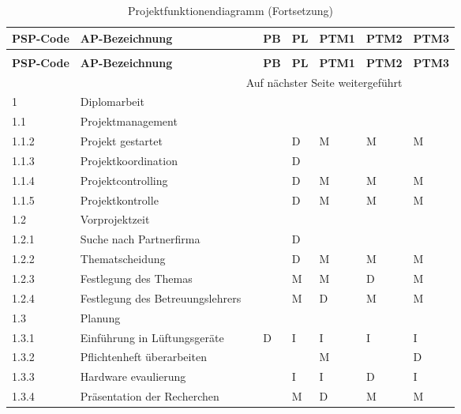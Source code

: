 \newpage
\begin{longtable}{p{} p{} p{} p{}  p{} p{} p{} p{}}
	\caption{Projektfunktionendiagramm}
	\label{tab:funktionendiagramm}
	\\ \toprule
	\textbf{PSP-Code} & \textbf{AP-Bezeichnung} & & \textbf{PB} & \textbf{PL} & \textbf{PTM1} & \textbf{PTM2} & \textbf{PTM3}
	\\ \midrule
	\endfirsthead
	\caption{Projektfunktionendiagramm (Fortsetzung)}
	\\ \toprule
	\textbf{PSP-Code} & \textbf{AP-Bezeichnung} & & \textbf{PB} & \textbf{PL} & \textbf{PTM1} & \textbf{PTM2} & \textbf{PTM3}
	\\ \midrule
	\endhead
	\midrule
	\multicolumn{7}{r}{{Auf nächster Seite weitergeführt}} 
	\\ \bottomrule
	\endfoot
	\bottomrule
	\endlastfoot
	\rowcolor{mygray} 1 & Diplomarbeit & & & & & & \\ \midrule
	\rowcolor{mygray2}1.1 & Projektmanagement & & & & & &\\ \midrule
	1.1.2 & Projekt gestartet & & & D & M & M & M \\ \midrule
	1.1.3 & Projektkoordination & & & D & & & \\ \midrule
	1.1.4 & Projektcontrolling & & & D & M & M & M \\ \midrule
	1.1.5 & Projektkontrolle & & & D & M & M & M \\ \midrule
	\rowcolor{mygray2}1.2 & Vorprojektzeit & & & & & & \\ \midrule
	1.2.1 & Suche nach Partnerfirma & & & D & & & \\ \midrule
	1.2.2 & Thematscheidung & & & D & M & M & M \\ \midrule
	1.2.3 & Festlegung des Themas & & & M & M & D & M \\ \midrule
	1.2.4 & Festlegung des Betreuungslehrers & & & M & D & M & M \\ \midrule
	\rowcolor{mygray2}1.3 & Planung & & & & & & \\ \midrule
	1.3.1 & Einführung in Lüftungsgeräte & & D & I & I & I & I \\ \midrule
	1.3.2 & Pflichtenheft überarbeiten & & & & M & & D \\ \midrule
	1.3.3 & Hardware evaulierung & & & I & I & D & I \\ \midrule
	1.3.4 & Präsentation der Recherchen & & & M & D & M & M \\ \midrule

\end{longtable}
